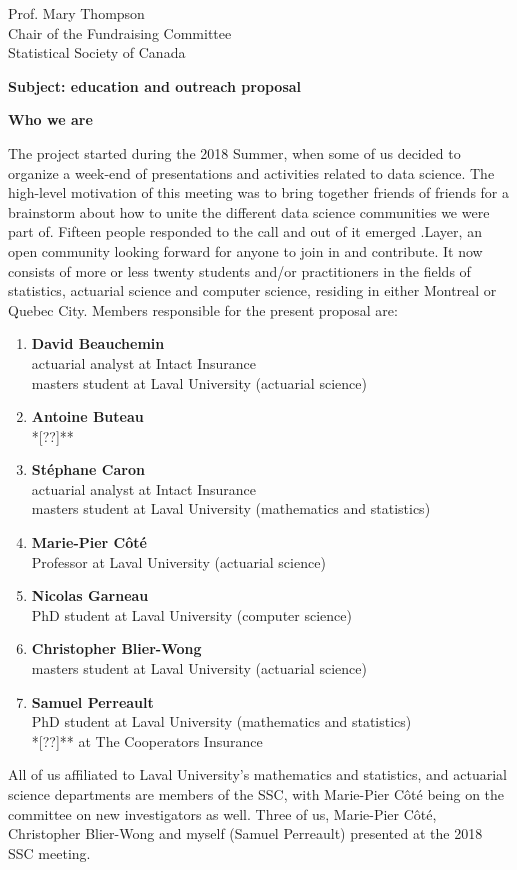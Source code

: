 \documentclass[11pt, a4paper]{letter} %
\begin{document}
\begin{letter}{
	Prof. Mary Thompson\\
	Chair of the Fundraising Committee\\
	Statistical Society of Canada
	
	\bigskip
	\textbf{Subject: education and outreach proposal}%
}
\bigskip
\noindent \textbf{Who we are}

The project started during the 2018 Summer, when some of us decided to organize a week-end of presentations and activities related to data science. The high-level motivation of this meeting was to bring together friends of friends for a brainstorm about how to unite the different data science communities we were part of. Fifteen people responded to the call and out of it emerged .Layer, an open community looking forward for anyone to join in and contribute. It now consists of more or less twenty students and/or practitioners in the fields of statistics, actuarial science and computer science, residing in either Montreal or Quebec City. Members responsible for the present proposal are:
\begin{enumerate}
	\item[] \textbf{David Beauchemin}\\
	\quad actuarial analyst at Intact Insurance\\
	\quad masters student at Laval University (actuarial science)
	\item[] \textbf{Antoine Buteau}\\
	\quad **[??]**
	\item[] \textbf{Stéphane Caron}\\
	\quad actuarial analyst at Intact Insurance\\
	\quad masters student at Laval University (mathematics and statistics)
	\item[] \textbf{Marie-Pier Côté}\\
	\quad Professor at Laval University (actuarial science)
	\item[] \textbf{Nicolas Garneau}\\
	\quad PhD student at Laval University (computer science)
	\item[] \textbf{Christopher Blier-Wong}\\
	\quad masters student at Laval University (actuarial science)
	\item[] \textbf{Samuel Perreault}\\
	\quad PhD student at Laval University (mathematics and statistics)\\
	\quad **[??]** at The Cooperators Insurance
\end{enumerate}

All of us affiliated to Laval University's mathematics and statistics, and actuarial science departments are members of the SSC, with Marie-Pier Côté being on the committee on new investigators as well. Three of us, Marie-Pier Côté, Christopher Blier-Wong and myself (Samuel Perreault) presented at the 2018 SSC meeting.



\end{letter}
\end{document}
